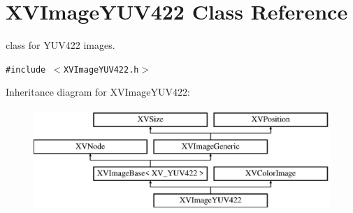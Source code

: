 \hypertarget{class_XVImageYUV422}{
\section{XVImage\-YUV422  Class Reference}
\label{XVImageYUV422}
}
class for YUV422 images. 


{\tt \#include $<$XVImage\-YUV422.h$>$}

Inheritance diagram for XVImage\-YUV422:\begin{figure}[H]
\begin{center}
\leavevmode
\includegraphics[height=3.82906cm]{class_XVImageYUV422}
\end{center}
\end{figure}
